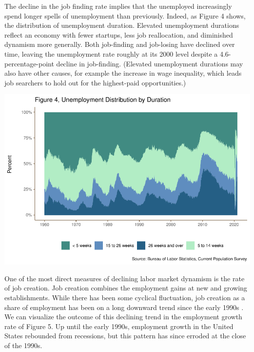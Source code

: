 \documentclass[
  11pt,
]{article}
\begin{document}
The decline in the job finding rate implies that the unemployed
increasingly spend longer spells of unemployment than previously.
Indeed, as Figure 4 shows, the distribution of unemployment duration.
Elevated unemployment durations reflect an economy with fewer startups,
less job reallocation, and diminished dynamism more generally. Both
job-finding and job-losing have declined over time, leaving the
unemployment rate roughly at its 2000 level despite a
4.6-percentage-point decline in job-finding. (Elevated unemployment
durations may also have other causes, for example the increase in wage
inequality, which leads job searchers to hold out for the highest-paid
opportunities.)

\begin{center}\includegraphics{JOLTS_files/figure-latex/unnamed-chunk-8-1} \end{center}

One of the most direct measures of declining labor market dynamism is
the rate of job creation. Job creation combines the employment gains at
new and growing establishments. While there has been some cyclical
fluctuation, job creation as a share of employment has been on a long
downward trend since the early 1990s \citep{davis14}. We can visualize
the outcome of this declining trend in the employment growth rate of
Figure 5. Up until the early 1990s, employment growth in the United
States rebounded from recessions, but this pattern has since erroded at
the close of the 1990s.
\end{document}
